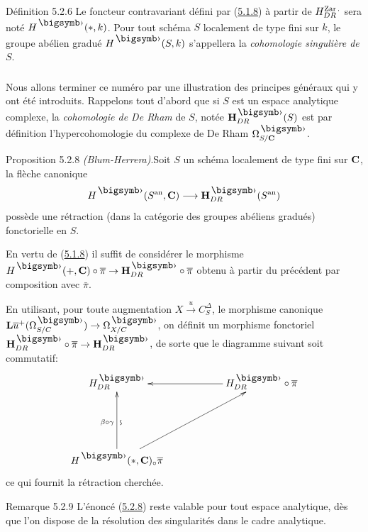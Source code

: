 \documentclass[10pt]{../fichiers-configuration-latex/smfart}
\begin{document}
\begin{enonce*}{Définition 5.2.6}
Le foncteur contravariant défini par (\hyperref[Vbis.prop5.1.8]{5.1.8}) à partir de
$H^{\operatorname{Zar}.}_{DR}$ sera noté $H^{\bigdot} (\ast, k)$. Pour tout schéma $S$
localement de type fini sur $k$, le groupe abélien gradué
$H^{\bigdot}(S, k)$ s'appellera la \emph{cohomologie singulière de} $S$.
\end{enonce*}

\setcounter{subsubsection}{6}
\subsubsection{}
Nous allons terminer ce numéro par une illustration des principes
généraux qui y ont été introduits. Rappelons tout d'abord que si $S$
est un espace analytique complexe, la \emph{cohomologie de De Rham} de
$S$, notée $\HH^{\bigdot}_{DR}(S)$ est par définition
l'hypercohomologie du complexe de De Rham $\Omega^{\bigdot}_{S /
  \CC}$.

\begin{enonce*}{Proposition 5.2.8}
\emph{(Blum-Herrera)}.\pageoriginale Soit $S$ un schéma localement de type fini sur
  $\mathbf{C}$, la flèche canonique
$$
H^{\bigdot} (S^{\an}, \CC) \longrightarrow
\HH^{\bigdot}_{DR}(S^{\an})
$$
possède une rétraction (dans la catégorie des groupes abéliens
gradués) fonctorielle en $S$.
\end{enonce*}

En vertu de (\hyperref[Vbis.prop5.1.8]{5.1.8}) il suffit de considérer le morphisme $H^{\bigdot}(+,
\CC) \circ \bar{\pi} \to \HH^{\bigdot}_{DR} \circ
\bar{\pi}$ obtenu à partir du précédent par composition avec
$\bar{\pi}$.

En utilisant, pour toute augmentation $X \xrightarrow{u}
C^{\Delta}_S$, le morphisme canonique
$\LL \bar{u}^{+}(\Omega^{\bigdot}_{S/C}) \to \Omega^{\bigdot}_{X/C}$, on
définit un morphisme fonctoriel $\HH^{\bigdot}_{DR} \circ \bar{\pi}
\to \HH^{\bigdot}_{DR}$, de sorte que le diagramme suivant soit
commutatif:
\[
\xymatrix@=2cm{
H^{\bigdot}_{DR}  & H^{\bigdot}_{DR} \circ \bar{\pi} \ar[l]\\
H^{\bigdot}(\ast,\CC)_{\circ}\bar{\pi}
\ar[u]_{\text{\rotatebox{90}{$\backsim$}}}^{\beta \circ \gamma}
\ar[ru]&
}
\]
ce qui fournit la rétraction cherchée.

\begin{enonce*}[remark]{Remarque 5.2.9}
L'énoncé (\hyperref[Vbis.prop5.2.8]{5.2.8}) reste valable pour tout espace analytique, dès que
l'on dispose de la résolution des singularités dans le cadre analytique.
\end{enonce*}
\end{document}
